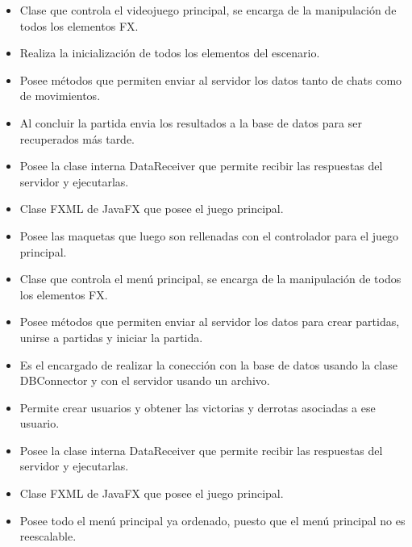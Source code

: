 \documentclass{article}
\begin{document}

\begin{itemize}
	\item Clase que controla el videojuego principal, se encarga de la manipulación de todos los elementos FX.
	\item Realiza la inicialización de todos los elementos del escenario.
	\item Posee métodos que permiten enviar al servidor los datos tanto de chats como de movimientos.
	\item Al concluir la partida envia los resultados a la base de datos para ser recuperados más tarde.
	\item Posee la clase interna DataReceiver que permite recibir las respuestas del servidor y ejecutarlas.
\end{itemize}

\begin{itemize}
	\item Clase FXML de JavaFX que posee el juego principal.
	\item Posee las maquetas que luego son rellenadas con el controlador para el juego principal.
\end{itemize}

\begin{itemize}
	\item Clase que controla el menú principal, se encarga de la manipulación de todos los elementos FX.
	\item Posee métodos que permiten enviar al servidor los datos para crear partidas, unirse a partidas y iniciar la partida.
	\item Es el encargado de realizar la conección con la base de datos usando la clase DBConnector y con el servidor usando un archivo.
	\item Permite crear usuarios y obtener las victorias y derrotas asociadas a ese usuario.
	\item Posee la clase interna DataReceiver que permite recibir las respuestas del servidor y ejecutarlas.
\end{itemize}

\begin{itemize}
	\item Clase FXML de JavaFX que posee el juego principal.
	\item Posee todo el menú principal ya ordenado, puesto que el menú principal no es reescalable.
\end{itemize}
\end{document}
